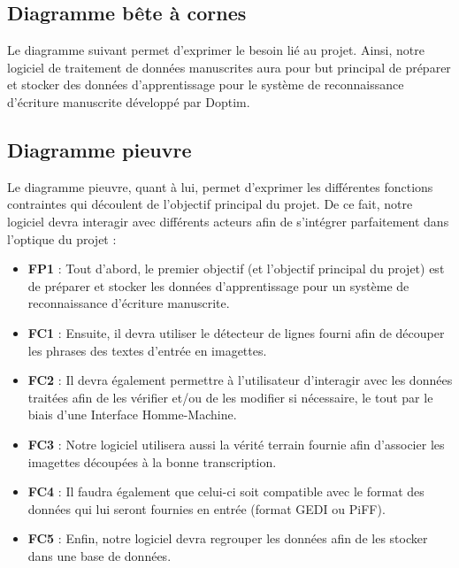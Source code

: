 \subsection{Diagramme bête à cornes}

Le diagramme suivant permet d’exprimer le besoin lié au projet. Ainsi, notre logiciel de
traitement de données manuscrites aura pour but principal de préparer et stocker des données
d’apprentissage pour le système de reconnaissance d’écriture manuscrite développé par Doptim.


\subsection{Diagramme pieuvre}

Le diagramme pieuvre, quant à lui, permet d’exprimer les différentes fonctions contraintes
qui découlent de l’objectif principal du projet. De ce fait, notre logiciel devra interagir
avec différents acteurs afin de s’intégrer parfaitement dans l’optique du projet :

\begin{itemize}
\item \textbf{FP1} : Tout d’abord, le premier objectif (et l’objectif principal du projet) est
de préparer et stocker les données d’apprentissage pour un système de reconnaissance d’écriture manuscrite.
\item \textbf{FC1} : Ensuite, il devra utiliser le détecteur de lignes fourni afin de découper
les phrases des textes d’entrée en imagettes. 
\item \textbf{FC2} : Il devra également permettre à l’utilisateur d’interagir avec les données
traitées afin de les vérifier et/ou de les modifier si nécessaire, le tout par le biais d’une Interface Homme-Machine. 
\item \textbf{FC3} : Notre logiciel utilisera aussi la vérité terrain fournie afin d’associer
les imagettes découpées à la bonne transcription.
\item \textbf{FC4} : Il faudra également que celui-ci soit compatible avec le format des données
qui lui seront fournies en entrée (format GEDI ou PiFF).
\item \textbf{FC5} : Enfin, notre logiciel devra regrouper les données afin de les stocker dans une base de données.
\end{itemize}

